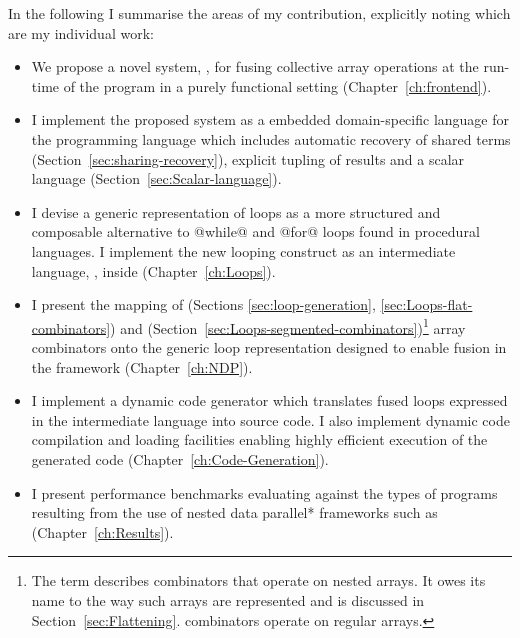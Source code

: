 \documentclass[preamble.tex]{subfiles}
\begin{document}
In the following I summarise the areas of my contribution, explicitly noting which are my individual work:
\begin{itemize}

  \item We propose a novel system, \LiveFusion, for fusing collective array operations at the run-time of the program in a purely functional setting (Chapter~\ref{ch:frontend}).

  \item I implement the proposed system as a embedded domain-specific language for the \Haskell programming language which includes automatic recovery of shared terms (Section~\ref{sec:sharing-recovery}), explicit tupling of results and a scalar language (Section~\ref{sec:Scalar-language}).

  \item I devise a generic representation of loops as a more structured and composable alternative to @while@ and @for@ loops found in procedural languages. I implement the new looping construct as an intermediate language, \Loop, inside \LiveFusion (Chapter~\ref{ch:Loops}).

  \item I present the mapping of  (Sections \ref{sec:loop-generation}, \ref{sec:Loops-flat-combinators}) and  (Section~\ref{sec:Loops-segmented-combinators})\footnote{The term  describes combinators that operate on nested arrays. It owes its name to the way such arrays are represented and is discussed in Section~\ref{sec:Flattening}.  combinators operate on regular arrays.} array combinators onto the generic loop representation designed to enable fusion in the  framework (Chapter~\ref{ch:NDP}).

  \item I implement a dynamic code generator which translates fused loops expressed in the intermediate \Loop language into \Haskell source code. I also implement dynamic code compilation and loading facilities enabling highly efficient execution of the generated code (Chapter~\ref{ch:Code-Generation}).

  \item I present performance benchmarks evaluating \LiveFusion against the types of programs resulting from the use of \*nested data parallel* frameworks such as  (Chapter~\ref{ch:Results}).

\end{itemize}
\end{document}
